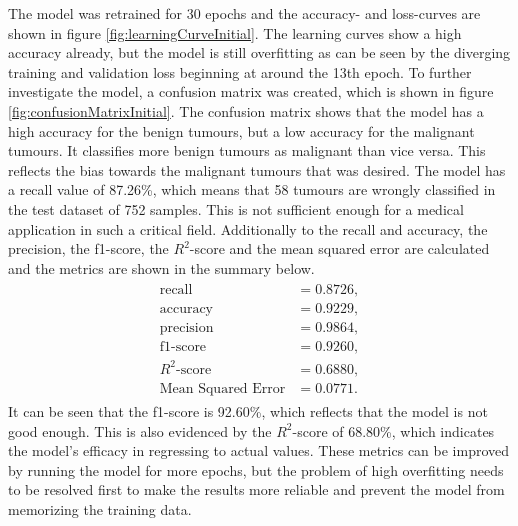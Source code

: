 The model was retrained for 30 epochs and the accuracy- and loss-curves are shown in figure \ref{fig:learningCurveInitial}.
The learning curves show a high accuracy already, but the model is still overfitting as can be seen by the diverging training and validation loss beginning at around the 13th epoch.
\newline
To further investigate the model, a confusion matrix was created, which is shown in figure \ref{fig:confusionMatrixInitial}.
The confusion matrix shows that the model has a high accuracy for the benign tumours, but a low accuracy for the malignant tumours.
It classifies more benign tumours as malignant than vice versa. %
This reflects the bias towards the malignant tumours that was desired.
The model has a recall value of 87.26\%, which means that 58 tumours are wrongly classified in the test dataset of 752 samples.
This is not sufficient enough for a medical application in such a critical field.
Additionally to the recall and accuracy, the precision, the f1-score, the $R^2$-score and the mean squared error are calculated and the metrics are shown in the summary below.
\begin{align}
    \label{eq:metricsInitialCNN}
    \begin{split}
        \text{recall} &= 0.8726, \\
        \text{accuracy} &= 0.9229, \\
        \text{precision} &= 0.9864, \\
        \text{f1-score} &= 0.9260, \\
        R^2\text{-score} &= 0.6880, \\
        \text{Mean Squared Error} &= 0.0771.
    \end{split}
\end{align}
It can be seen that the f1-score is 92.60\%, which reflects that the model is not good enough.
This is also evidenced by the $R^2$-score of 68.80\%, which indicates the model's efficacy in regressing to actual values.
These metrics can be improved by running the model for more epochs, but the problem of high overfitting needs to be resolved first to make the results more reliable and prevent the model from memorizing the training data.

